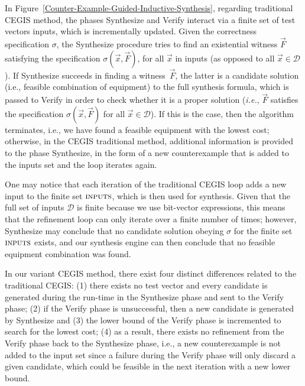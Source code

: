 \documentclass[journal]{IEEEtran}
\begin{document}
In Figure~\ref{Counter-Example-Guided-Inductive-Synthesis}, regarding traditional CEGIS method, the phases {\sc Synthesize} and {\sc Verify} interact via a finite set of test vectors {\sc inputs}, which is incrementally updated. Given the correctness specification $\sigma$, the {\sc Synthesize} procedure tries to find an existential witness $\vec{F}$ satisfying the specification $\sigma(\vec{x}, \vec{F})$, for all $\vec{x}$ in {\sc inputs} (as opposed to all $\vec{x} \in \mathcal{D}$). If {\sc Synthesize} succeeds in finding a witness~$\vec{F}$, the latter is a candidate solution (i.e., feasible combination of equipment) to the full synthesis formula, which is passed to {\sc Verify} in order to check whether it is a proper solution ({\it i.e.}, $\vec{F}$ satisfies the specification $\sigma(\vec{x}, \vec{F})$ for all $\vec{x}\in\mathcal{D}$). If this is the case, then the algorithm terminates, i.e., we have found a feasible equipment with the lowest cost; otherwise, in the CEGIS traditional method, additional information is provided to the phase {\sc Synthesize}, in the form of a new counterexample that is added to the {\sc inputs} set and the loop iterates again.

One may notice that each iteration of the traditional CEGIS loop adds a new input to the finite set $\text{\sc inputs}$, which is then used for synthesis. Given that the full set of inputs $\mathcal{D}$ is finite because we use bit-vector expressions, this means that the refinement loop can only iterate over a finite number of times; however, {\sc Synthesize} may conclude that no candidate solution obeying $\sigma$ for the finite set $\text{\sc inputs}$ exists, and our synthesis engine can then conclude that no feasible equipment combination was found.

In our variant CEGIS method, there exist four distinct differences related to the traditional CEGIS: 
(1) there exists no test vector and every candidate is generated during the run-time in the {\sc Synthesize} phase and sent to the {\sc Verify} phase; 
(2) if the {\sc Verify} phase is unsuccessful, then a new candidate is generated by {\sc Synthesize} and 
(3) the lower bound of the {\sc Verify} phase is incremented to search for the lowest cost; 
(4) as a result, there exists no refinement from the {\sc Verify} phase back to the {\sc Synthesize} phase, i.e., 
a new counterexample is not added to the {\sc input} set since a failure during the {\sc Verify} phase will only discard a given candidate, which could be feasible in the next iteration with a new lower bound.
\end{document}
